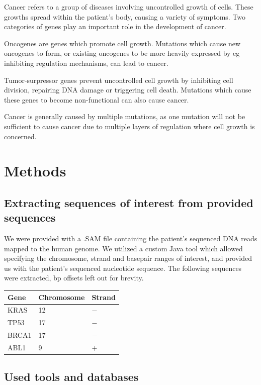 \documentclass[a4paper,english]{scrreprt}
\begin{document}
Cancer refers to a group of diseases involving uncontrolled growth of cells.
These growths spread within the patient's body, causing a variety of symptoms.
Two categories of genes play an important role in the development of cancer.

Oncogenes are genes which promote cell growth. Mutations which cause new
oncogenes to form, or existing oncogenes to be more heavily expressed by eg
inhibiting regulation mechanisms, can lead to cancer.

Tumor-surpressor genes prevent uncontrolled cell growth by inhibiting cell
division, repairing DNA damage or triggering cell death. Mutations which cause
these genes to become non-functional can also cause cancer.

Cancer is generally caused by multiple mutations, as one mutation will not be
sufficient to cause cancer due to multiple layers of regulation where cell
growth is concerned.

\chapter{Methods}

\section{Extracting sequences of interest from provided sequences}

We were provided with a .SAM file containing the patient's sequenced DNA reads
mapped to the human genome. We utilized a custom Java tool which allowed
specifying the chromosome, strand and basepair ranges of interest, and provided
us with the patient's sequenced nucleotide sequence. The following sequences
were extracted, bp offsets left out for brevity.

\begin{tabu}{lll}
	\toprule
	Gene & Chromosome & Strand \\
	\midrule
	KRAS  & 12 & $-$ \\
	TP53  & 17 & $-$ \\
	BRCA1 & 17 & $-$ \\
	ABL1  & 9  & $+$ \\
	\bottomrule
\end{tabu}

\section{Used tools and databases}
\end{document}

